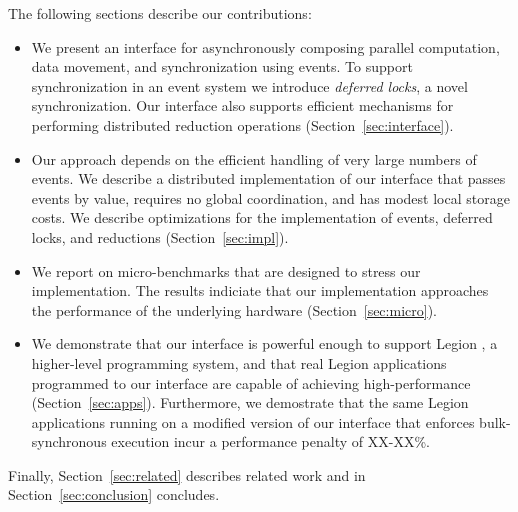 The following sections describe our contributions:
\begin{itemize}
\item We present an interface for asynchronously composing
parallel computation, data movement, and synchronization using events.  
To support synchronization in an event system we introduce {\em deferred locks}, 
a novel synchronization.   Our interface also supports efficient
mechanisms for performing distributed reduction operations (Section~\ref{sec:interface}).

\item Our approach depends on the efficient handling of very large numbers of events.
We describe a distributed implementation of our interface that passes events by value,
requires no global coordination, and has modest local storage costs.  We
describe optimizations for the implementation of events, deferred locks, and
reductions (Section~\ref{sec:impl}).

\item We report on micro-benchmarks that are designed to stress
our implementation.  The results indiciate that our implementation approaches the performance of
the underlying hardware (Section~\ref{sec:micro}).

\item We demonstrate that our interface is powerful enough to support Legion \cite{}, a higher-level
programming system,  and that real Legion applications programmed to our interface
are capable of achieving high-performance (Section~\ref{sec:apps}).  Furthermore, we demostrate
that the same Legion applications running on a modified version of our interface that enforces
bulk-synchronous execution incur a performance penalty of XX-XX\%.

\end{itemize}

Finally, Section~\ref{sec:related} describes related work and in Section~\ref{sec:conclusion}
concludes.

